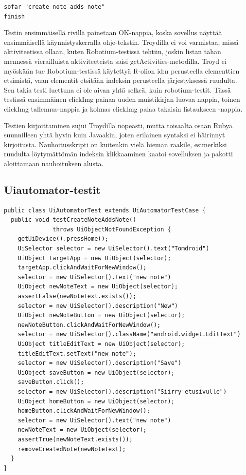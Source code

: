 \begin{lstlisting}[float, label=troyd_record_save,caption=Testin tallennus nauhoitusskriptistä Troydilla]
sofar "create note adds note"
finish
\end{lstlisting}

Testin ensimmäisellä rivillä painetaan OK-nappia, koska sovellus näyttää ensimmäisellä käynnistyskerralla ohje-tekstin. Troydilla ei voi varmistaa, missä aktiviteetissa ollaan, kuten Robotium-testissä tehtiin, joskin listan tähän mennessä vierailluista aktiviteeteista saisi getActivities-metodilla. Troyd ei myöskään tue Robotium-testissä käytettyä R-olion id:n perusteella elementtien etsimistä, vaan elementit etsitään indeksin perusteella järjestyksessä ruudulta. Sen takia testi luettuna ei ole aivan yhtä selkeä, kuin robotium-testit. Tässä testissä ensimmäinen clickImg painaa uuden muistikirjan luovaa nappia, toinen clickImg tallennus-nappia ja kolmas clickImg palaa takaisin listaukseen -nappia.

Testien kirjoittaminen sujui Troydilla nopeasti, mutta toisaalta osaan Rubya suunnilleen yhtä hyvin kuin Javaakin, joten erilainen syntaksi ei häirinnyt kirjoitusta. Nauhoitusskripti on kuitenkin vielä hieman raakile, esimerkiksi ruudulta löytymättömän indeksin klikkaaminen kaatoi sovelluksen ja pakotti aloittamaan nauhoituksen alusta.

\subsection{Uiautomator-testit}

\begin{lstlisting}[float, label=uiautomator_createnote,caption=Muistikirjan luontitesti Ui Automatorilla]
public class UiAutomatorTest extends UiAutomatorTestCase {
  public void testCreateNoteAddsNote() 
              throws UiObjectNotFoundException {
    getUiDevice().pressHome();
    UiSelector selector = new UiSelector().text("Tomdroid")
    UiObject targetApp = new UiObject(selector);
    targetApp.clickAndWaitForNewWindow();
    selector = new UiSelector().text("new note")
    UiObject newNoteText = new UiObject(selector);
    assertFalse(newNoteText.exists());
    selector = new UiSelector().description("New")
    UiObject newNoteButton = new UiObject(selector);
    newNoteButton.clickAndWaitForNewWindow();
    selector = new UiSelector().className("android.widget.EditText")
    UiObject titleEditText = new UiObject(selector);
    titleEditText.setText("new note");
    selector = new UiSelector().description("Save")
    UiObject saveButton = new UiObject(selector);
    saveButton.click();
    selector = new UiSelector().description("Siirry etusivulle")
    UiObject homeButton = new UiObject(selector);
    homeButton.clickAndWaitForNewWindow();
    selector = new UiSelector().text("new note")
    newNoteText = new UiObject(selector);
    assertTrue(newNoteText.exists());  
    removeCreatedNote(newNoteText);
  }
}
\end{lstlisting}

